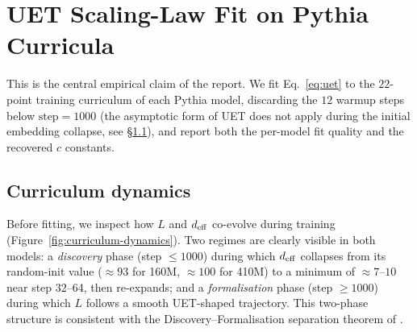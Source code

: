 \section{UET Scaling-Law Fit on Pythia Curricula}
\label{sec:curriculum}

This is the central empirical claim of the report. We fit
Eq.~\eqref{eq:uet} to the $22$-point training curriculum of each Pythia
model, discarding the $12$ warmup steps below $\text{step}=1000$
(the asymptotic form of UET does not apply during the initial embedding
collapse, see \S\ref{sec:curriculum-dynamics}), and report both the
per-model fit quality and the recovered $c$ constants.

\subsection{Curriculum dynamics}
\label{sec:curriculum-dynamics}

Before fitting, we inspect how $L$ and $d_{\mathrm{eff}}$ co-evolve during training
(Figure~\ref{fig:curriculum-dynamics}). Two regimes are clearly visible in
both models: a \emph{discovery} phase (step $\leq 1000$) during which
$d_{\mathrm{eff}}$ collapses from its random-init value ($\approx 93$ for 160M,
$\approx 100$ for 410M) to a minimum of $\approx 7$--$10$ near step 32--64,
then re-expands; and a \emph{formalisation} phase (step $\geq 1000$) during
which $L$ follows a smooth UET-shaped trajectory. This two-phase structure
is consistent with the Discovery--Formalisation separation theorem of
\citep{uet2026}.

